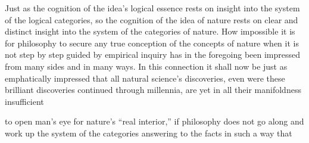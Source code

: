 \documentclass[12pt,a4paper]{book}
\begin{document}
Just as the cognition of the idea's logical essence rests on insight into the
system of the logical categories, so the cognition of the idea of nature rests on
clear and distinct insight into the system of the categories of nature. How
impossible it is for philosophy to secure any true conception of the concepts of
nature when it is not step by step guided by empirical inquiry has in the
foregoing been impressed from many sides and in many ways. In this connection it
shall now be just as emphatically impressed that all natural science's
discoveries, even were these brilliant discoveries continued through millennia,
are yet in all their manifoldness insufficient

\setcounter{footnote}{0}
to open man's eye for nature's ``real interior,'' if philosophy does not go along
and work up the system of the categories answering to the facts in such a way that
\end{document}
